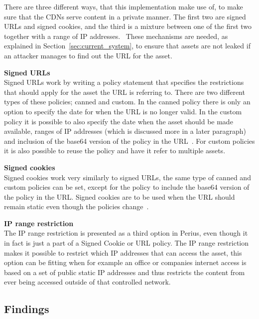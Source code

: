 \documentclass[a4paper,12pt]{article}
\newcounter{subsubsubsection}[subsubsection]
\begin{document}
 \label{sec:private_content}
There are three different ways, that this implementation make use of, to make sure that the CDNs
serve content in a private manner. The first two are signed URLs and signed cookies, and the third
is a mixture between one of the first two together with a range of IP addresses.~\cite{AWSPRIVATE}
These mechanisms are needed, as explained in Section~\ref{sec:current_system}, to ensure that assets
are not leaked if an attacker manages to find out the URL for the asset. \\

\par \textbf{Signed URLs} \\
Signed URLs work by writing a policy statement that specifies the restrictions that should apply for
the asset the URL is referring to. There are two different types of these policies; canned and
custom. In the canned policy there is only an option to specify the date for when the URL is no 
longer valid. In the custom policy it is possible to also specify the date when the asset should be
made available, ranges of IP addresses (which is discussed more in a later paragraph) and inclusion
of the base64 version of the policy in the URL~\cite{AWSSIGNED}. For custom policies it is also 
possible to reuse the policy and have it refer to multiple assets.\\

\par \textbf{Signed cookies} \\
Signed cookies work very similarly to signed URLs, the same type of canned and custom policies can
be set, except for the policy to include the base64 version of the policy in the URL. Signed cookies
are to be used when the URL should remain static even though the policies change~\cite{AWSCOOKIES}.
\\

\par \textbf{IP range restriction} \\
The IP range restriction is presented as a third option in Perius, even though it in fact is just a
part of a Signed Cookie or URL policy. The IP range restriction makes it possible to restrict which
IP addresses that can access the asset, this option can be fitting when for example an office or
companies internet access is based on a set of public static IP addresses and thus restricts the
content from ever being accessed outside of that controlled network.

\subsection{Findings}
\end{document}
